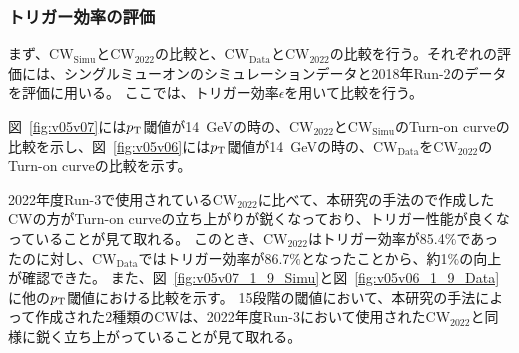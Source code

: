 \subsubsection{トリガー効率の評価}
まず、$\mathrm{CW_{Simu}}$と$\mathrm{CW_{2022}}$の比較と、$\mathrm{CW_{Data}}$と$\mathrm{CW_{2022}}$の比較を行う。それぞれの評価には、シングルミューオンのシミュレーションデータと2018年Run-2のデータを評価に用いる。
ここでは、トリガー効率$\epsilon$を用いて比較を行う。

図~\ref{fig:v05v07}には$p_{\rm{T}}$閾値が14~GeVの時の、$\mathrm{CW_{2022}}$と$\mathrm{CW_{Simu}}$のTurn-on curveの比較を示し、図~\ref{fig:v05v06}には$p_{\rm{T}}$閾値が14~GeVの時の、$\mathrm{CW_{Data}}$を$\mathrm{CW_{2022}}$のTurn-on curveの比較を示す。

2022年度Run-3で使用されている$\mathrm{CW_{2022}}$に比べて、本研究の手法ので作成したCWの方がTurn-on curveの立ち上がりが鋭くなっており、トリガー性能が良くなっていることが見て取れる。
このとき、$\mathrm{CW_{2022}}$はトリガー効率が85.4$\%$であったのに対し、$\mathrm{CW_{Data}}$ではトリガー効率が86.7$\%$となったことから、約1$\%$の向上が確認できた。
また、図~\ref{fig:v05v07_1_9_Simu}と図~\ref{fig:v05v06_1_9_Data}に他の$p_{\rm{T}}$閾値における比較を示す。
15段階の閾値において、本研究の手法によって作成された2種類のCWは、2022年度Run-3において使用された$\mathrm{CW_{2022}}$と同様に鋭く立ち上がっていることが見て取れる。
